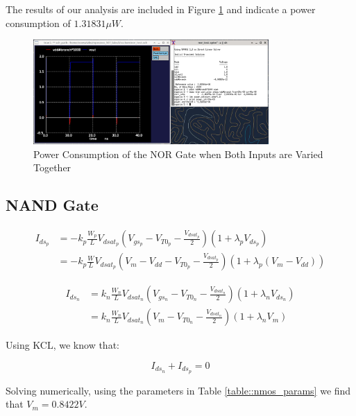 \documentclass[fleqn]{article}
\begin{document}
	The results of our analysis are included in Figure \ref{fig::nor_power_sweep_va_vb} and indicate a power consumption of $1.31831{\mu}W$. 
	
	\begin{figure}[H]
		\centerline{\includegraphics[width=0.8\textwidth]{nor_power_sweep_va_vb.png}}
		\caption{Power Consumption of the NOR Gate when Both Inputs are Varied Together}
		\label{fig::nor_power_sweep_va_vb}
	\end{figure}	
	
	\subsection{NAND Gate}

	\begin{align}
		I_{ds_p} &= -k_p\frac{W_p}{L}V_{dsat_p}\left(V_{gs_p} - V_{T0_p} - \frac{V_{dsat_p}}{2}\right)\left(1 + {\lambda_p}V_{ds_p}\right) \\
		&= -k_p\frac{W}{L}V_{dsat_p}\left(V_m - V_{dd} - V_{T0_p} - \frac{V_{dsat_p}}{2}\right)\left(1 + {\lambda_p}(V_m - V_{dd})\right)
	\end{align}
	
	\begin{align}
		I_{ds_n} &= k_n\frac{W_n}{L}V_{dsat_n}\left(V_{gs_n} - V_{T0_n} - \frac{V_{dsat_n}}{2}\right)\left(1 + {\lambda_n}V_{ds_n}\right) \\
		&= k_n\frac{W_n}{L}V_{dsat_n}\left(V_m - V_{T0_n} - \frac{V_{dsat_n}}{2}\right)\left(1 + {\lambda_n}V_m\right)
	\end{align}
	
	Using KCL, we know that:
	
	\begin{equation}
		I_{ds_n} + I_{ds_p} = 0
	\end{equation}
	
	Solving numerically, using the parameters in Table \ref{table::nmos_params} we find that $V_m = 0.8422 V$.
	
	
\end{document}
